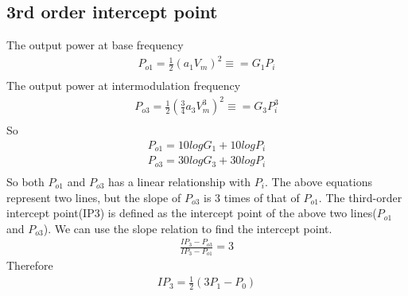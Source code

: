 \documentclass[a4paper]{article}
\begin{document}
\subsection{3rd order intercept point}
The output power at base frequency 
\begin{align*}
	P_{o1} = \frac{1}{2} (a_1 V_m)^2 \equiv = G_1 P_i \\ 
\end{align*}
The output power at intermodulation frequency 
\begin{align*}
	P_{o3} = \frac{1}{2} (\frac{3}{4}a_3 V^3_m)^2 \equiv = G_3 P^3_i \\
\end{align*}
So
\begin{align*}
	P_{o1} = 10 log G_1 + 10 log P_i\\
    P_{o3} = 30 log G_3	+ 30 log P_i\\
 \end{align*}
 So both $P_{o1}$ and $P_{o3}$ has a linear relationship with $P_i$. The above equations represent two lines, but the slope of $P_{o3}$ is 3 times of that of $P_{o1}$.
 The third-order intercept point(IP3) is defined as the intercept point of the above two lines($P_{o1}$ and $P_{o3}$). We can use the slope relation to find the intercept point.
 \begin{align*}
	\frac{IP_3 - P_{o3}}{IP_3 - P_{o1}} = 3
\end{align*}
Therefore
\begin{align*}
	IP_3 = \frac{1}{2} (3P_1 - P_0)
\end{align*}
\end{document}
